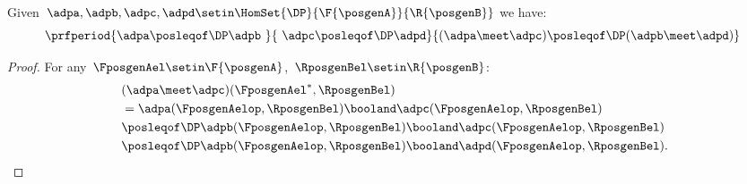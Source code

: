 \begin{lemma}
    \label{lem:intersection_mon}
    Given~$\adpa,\adpb,\adpc,\adpd \setin \HomSet{\DP}{\F{\posgenA}}{\R{\posgenB}}$ we have:
    \begin{equation}
        \prfperiod{\adpa\posleqof\DP \adpb\ }{\ \adpc\posleqof\DP \adpd}{(\adpa\meet \adpc)\posleqof\DP (\adpb\meet \adpd)}
    \end{equation}
\end{lemma}
\begin{proof}
    For any~$\FposgenAel\setin \F{\posgenA}$,~$\RposgenBel\setin \R{\posgenB}$:
    \begin{equation}
        \begin{aligned}
            ~ & (\adpa \meet \adpc)(\FposgenAel^*,\RposgenBel) \\
              & =\adpa(\FposgenAelop,\RposgenBel)\booland \adpc(\FposgenAelop,\RposgenBel) \\
              & \posleqof\DP \adpb(\FposgenAelop,\RposgenBel)\booland \adpc(\FposgenAelop,\RposgenBel) \\
              & \posleqof\DP \adpb(\FposgenAelop,\RposgenBel)\booland \adpd(\FposgenAelop,\RposgenBel).
        \end{aligned}
    \end{equation}
\end{proof}
